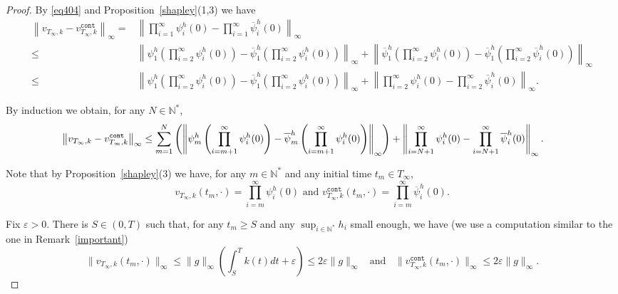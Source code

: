 \documentclass[english,openary,12pt]{article}
\theoremstyle{definition}
\newcommand{\N}{\mathbb{N}}
\begin{document}
\begin{proof}
By \eqref{eq404} and Proposition~\ref{shapley}(1,3) we have 
\begin{align*}
  \left\|
  v_{T_\infty,k} - 
  v^{\texttt{cont}}_{T_\infty,k} \right\|_\infty =&
  \left\|\prod_{i = 1}^\infty \psi^h_i (0) -
  \prod_{i = 1}^\infty \overline \psi^h_i (0) \right\|_\infty \\
  \le& \left\|\psi^h_1\left(\prod_{i = 2}^\infty \psi^h_i (0)\right) - 
  \overline \psi^h_1 \left(\prod_{i = 2}^\infty \psi^h_i (0)\right)
  \right\|_\infty + 
  \left\|\overline \psi^h_1 \left(\prod_{i = 2}^\infty \psi^h_i (0)\right) - 
  \overline \psi^h_1 \left(\prod_{i = 2}^\infty \overline \psi^h_i (0)\right)
  \right\|_\infty \\
  \le&\left\|\psi^h_1\left(\prod_{i = 2}^\infty \psi^h_i (0)\right) - 
  \overline \psi^h_1 \left(\prod_{i = 2}^\infty \psi^h_i (0)\right)
  \right\|_\infty + 
  \left\|\prod_{i = 2}^\infty \psi^h_i (0) - 
  \prod_{i = 2}^\infty \overline \psi^h_i (0) \right\|_\infty.
\end{align*}

By induction we obtain, for any $N \in \N^*$,
\begin{multline}
  \hspace{-0.65cm}
  \label{fpvv01}
  \left\|v_{T_\infty,k} - 
  v^{\texttt{cont}}_{T_\infty,k} \right\|_\infty \le 
  \sum_{m=1}^N \left(\left\|\psi^h_m
  \left(\prod_{i = m+1}^\infty \psi^h_i (0)\right) - 
  \overline \psi^h_m \left(\prod_{i = m+1}^\infty 
  \psi^h_i (0)\right)\right\|_\infty\right) + 
  \left\|\prod_{i = N+1}^\infty \psi^h_i (0) - 
  \prod_{i = N+1}^\infty \overline \psi^h_i (0) \right\|_\infty.
\end{multline}

Note that by Proposition~\ref{shapley}(3) we have, for any $m \in \N^*$ and any
initial time $t_m \in T_\infty$,
\begin{equation}
  \label{fpvv02}
  v_{T_\infty,k}(t_m,\cdot) = \prod_{i = m}^\infty \psi^h_i (0) \text{ and }
  v^{\texttt{cont}}_{T_\infty,k}(t_m,\cdot) = 
  \prod_{i = m}^\infty \overline \psi^h_i (0).
\end{equation}

Fix $\varepsilon > 0$. There is $S \in (0,T)$ such that, 
for any $t_m \ge S$ and any $\sup_{i\in\N^*} h_i$ small enough, we have
(we use a computation similar to the one in
Remark~\ref{important})
\begin{equation}
  \label{fpvv03}
  \|v_{T_\infty,k}(t_m,\cdot)\|_\infty \le
  \|g\|_\infty \left(\int_S^T k(t) dt + \varepsilon\right) \le
  2 \varepsilon \|g\|_\infty
  \;\; \text{ and } \;\;
  \|v^{\texttt{cont}}_{T_\infty,k}(t_m,\cdot)\|_\infty \le
  2 \varepsilon \|g\|_\infty.
\end{equation}


\end{proof}
\end{document}
